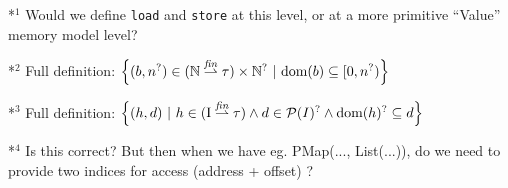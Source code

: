 \documentclass[,a4paper,oneside]{article}
\newcommand{\code}[1]{\texttt{#1}}
\newcommand{\itl}[1]{{\it#1}}
\newcommand{\finmap}{\stackrel{\itl{fin}}\rightharpoonup}
\newcommand{\pset}{{\cal P}}
\newcommand{\idx}[1]{${}^{#1}$}
\begin{document}
\vspace{1cm}
*\idx1 Would we define \code{load} and \code{store} at this level, or at a more primitive ``Value'' memory model level?

*\idx2 Full definition: $\left\{ (b, n^?) \in (\mathbb N \finmap \tau) \times \mathbb N^? ~|~ \text{dom}(b) \subseteq [0, n^?)  \right\}$

*\idx3 Full definition: $\left\{ (h,d) ~|~ h\in (\text{I} \finmap \tau )\land d\in\pset(I)^?\land\text{dom}(h)^?\subseteq d\right\}$

*\idx4 Is this correct? But then when we have eg. PMap(..., List(...)), do we need to provide two indices for access (address + offset) ? 
\end{document}
